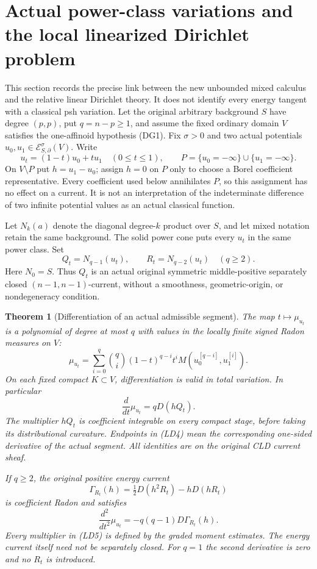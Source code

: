 \documentclass[11pt,a4paper]{article}
\numberwithin{equation}{section}
\newtheorem{theorem}{Theorem}[section]
\theoremstyle{definition}
\theoremstyle{remark}
\begin{document}


\section{Actual power-class variations and the local linearized Dirichlet problem}
\label{sec:r11-linearized-power-Dirichlet}

This section records the precise link between the new unbounded mixed
calculus and the relative linear Dirichlet theory.  It does not identify
every energy tangent with a classical psh variation.  Let the original
arbitrary background $S$ have degree $(p,p)$, put $q=n-p\ge1$, and assume
the fixed ordinary domain $V$ satisfies the one-affinoid hypothesis
(DG1).  Fix $\sigma>0$ and two actual potentials
$u_0,u_1\in\mathcal E^\sigma_{S,\partial}(V)$.  Write
\[
 u_t=(1-t)u_0+tu_1\quad(0\le t\le1),\qquad
 P=\{u_0=-\infty\}\cup\{u_1=-\infty\}.
 \tag{LD1}
\]
On $V\setminus P$ put $h=u_1-u_0$; assign $h=0$ on $P$ only to
choose a Borel coefficient representative.  Every coefficient used
below annihilates $P$, so this assignment has no effect on a current.
It is not an interpretation of the indeterminate difference of two
infinite potential values as an actual classical function.

Let $N_k(a)$ denote the diagonal degree-$k$ product over $S$, and let
mixed notation retain the same background.  The solid power cone puts
every $u_t$ in the same power class.  Set
\[
             Q_t=N_{q-1}(u_t),\qquad
             R_t=N_{q-2}(u_t)\quad(q\ge2).
 \tag{LD2}
\]
Here $N_0=S$.  Thus $Q_t$ is an actual original symmetric
middle-positive separately closed $(n-1,n-1)$-current, without a
smoothness, geometric-origin, or nondegeneracy condition.

\begin{theorem}[Differentiation of an actual admissible segment]
\label{thm:r11-actual-power-segment-derivative}
The map $t\mapsto\mu_{u_t}$ is a polynomial of degree at most $q$
with values in the locally finite signed Radon measures on $V$:
\[
 \mu_{u_t}
  =\sum_{i=0}^q\binom qi(1-t)^{q-i}t^i
                  M(u_0^{[q-i]},u_1^{[i]}).
 \tag{LD3}
\]
On each fixed compact $K\subset V$, differentiation is valid in total
variation.  In particular
\[
                  \frac d{dt}\mu_{u_t}=qD(hQ_t).
 \tag{LD4}
\]
The multiplier $hQ_t$ is coefficient integrable on every compact
stage, before taking its distributional curvature.  Endpoints in
(LD4) mean the corresponding one-sided derivative of the actual
segment.  All identities are on the original CLD current sheaf.

If $q\ge2$, the original positive energy current
\[
 \Gamma_{R_t}(h)
       =\tfrac12D(h^2R_t)-hD(hR_t)
 \tag{LD5}
\]
is coefficient Radon and satisfies
\[
             \frac {d^2}{dt^2}\mu_{u_t}
                       =-q(q-1)D\Gamma_{R_t}(h).
 \tag{LD6}
\]
Every multiplier in (LD5) is defined by the graded moment estimates.
The energy current itself need not be separately closed.  For $q=1$
the second derivative is zero and no $R_t$ is introduced.
\end{theorem}
\end{document}
